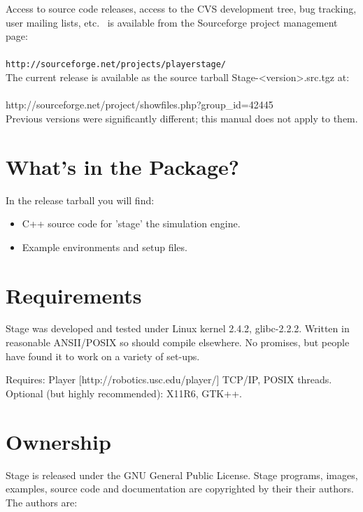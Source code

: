 \documentclass[11pt]{report}
\def\SFPAGE {{\tt http://sourceforge.net/projects/playerstage/}}
\begin{document}
   \noindent Access to source code releases, access to the CVS
   development tree, bug tracking, user mailing lists, etc.~ is
   available from the Sourceforge project management page:\\\\\indent
   \SFPAGE\\

   \noindent The current release is available as the source tarball
 Stage-<version>.src.tgz at:\\\\ \indent
 http://sourceforge.net/project/showfiles.php?group\_id=42445\\

	Previous versions were significantly different; this manual
   does not apply to them.

  \section{What's in the Package?}

    In the release tarball you will find:
      \begin{itemize}    
      \item C++ source code for 'stage' the simulation engine.
      \item Example environments and setup files.
      \end{itemize}



  \section{Requirements}

    Stage was developed and tested under Linux kernel 2.4.2,
    glibc-2.2.2.  Written in reasonable ANSII/POSIX so should compile
    elsewhere. No promises, but people have found it to work on a
    variety of set-ups.

    Requires: Player [http://robotics.usc.edu/player/]
              TCP/IP, POSIX threads.
	Optional (but highly recommended): X11R6, GTK++.
  
  \section{Ownership}

    Stage is released under the GNU General Public
    License. Stage programs, images, examples, source code and
    documentation are copyrighted by their their authors. The authors are:
\end{document}
